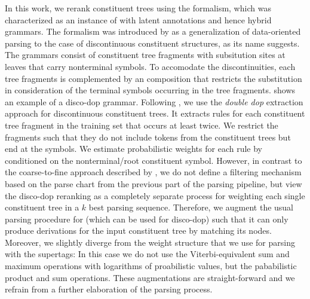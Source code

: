 \documentclass[../../document.tex]{subfiles}
\begin{document}
    In this work, we rerank constituent trees using the  formalism, which was characterized as an instance of  with latent annotations \citep[cf.\@ section~4]{Cra11} and hence hybrid grammars. \citep[cf.\@ section~8.5.1]{Geb20}
    The formalism was introduced by \citet{Cra11} as a generalization of data-oriented parsing \citep{Bod92} to the case of discontinuous constituent structures, as its name suggests.
    The grammars consist of constituent tree fragments with subsitution sites at leaves that carry nonterminal symbols.
    To accomodate the discontinuities, each tree fragments is complemented by an  composition that restricts the substitution in consideration of the terminal symbols occurring in the tree fragments.
     shows an example of a disco-dop grammar.
    Following \citet{San11,Cra11}, we use the \emph{double dop} extraction approach for discontinuous constituent trees.
    It extracts rules for each constituent tree fragment in the training set that occurs at least twice.
    We restrict the fragments such that they do not include tokens from the constituent trees but end at the  symbols.
    We estimate probabilistic weights for each rule by conditioned on the  nonterminal/root constituent symbol.
    However, in contrast to the coarse-to-fine approach described by \citet{Cra11}, we do not define a filtering mechanism based on the parse chart from the previous part of the parsing pipeline, but view the disco-dop reranking as a completely separate process for weighting each single constituent tree in a \(k\) best parsing sequence.
    Therefore, we augment the usual parsing procedure for  (which can be used for disco-dop) such that it can only produce derivations for the input constituent tree by matching its nodes.
    Moreover, we slightly diverge from the weight structure that we use for parsing with the supertags:
        In this case we do not use the Viterbi-equivalent sum and maximum operations with logarithms of proabilistic values, but the pababilistic product and sum operations.
    These augmentations are straight-forward and we refrain from a further elaboration of the parsing process.
    
\end{document}
